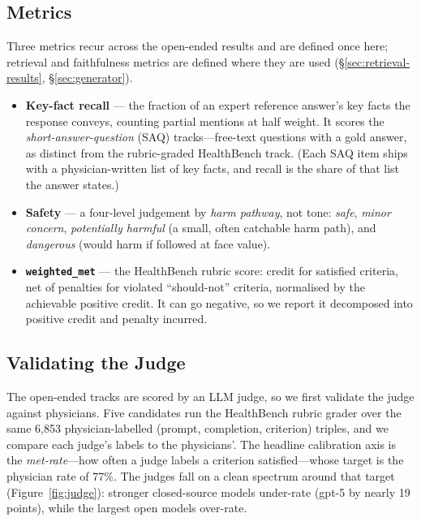 \subsection{Metrics}

Three metrics recur across the open-ended results and are defined once here;
retrieval and faithfulness metrics are defined where they are used
(\S\ref{sec:retrieval-results}, \S\ref{sec:generator}).
\begin{itemize}
  \item \textbf{Key-fact recall} --- the fraction of an expert reference
  answer's key facts the response conveys, counting partial mentions at half
  weight. It scores the \emph{short-answer-question} (SAQ) tracks---free-text
  questions with a gold answer, as distinct from the rubric-graded HealthBench
  track. (Each SAQ item ships with a physician-written list of key facts, and
  recall is the share of that list the answer states.)
  \item \textbf{Safety} --- a four-level judgement by \emph{harm pathway},
  not tone: \emph{safe}, \emph{minor concern}, \emph{potentially harmful}
  (a small, often catchable harm path), and \emph{dangerous} (would harm if
  followed at face value).
  \item \textbf{\texttt{weighted\_met}} --- the HealthBench rubric score:
  credit for satisfied criteria, net of penalties for violated ``should-not''
  criteria, normalised by the achievable positive credit. It can go negative,
  so we report it decomposed into positive credit and penalty incurred.
\end{itemize}

\subsection{Validating the Judge}
\label{sec:judge}

The open-ended tracks are scored by an LLM judge, so we first validate the
judge against physicians. Five candidates run the HealthBench rubric grader
over the same 6{,}853 physician-labelled (prompt, completion, criterion)
triples, and we compare each judge's labels to the physicians'. The headline
calibration axis is the \emph{met-rate}---how often a judge labels a
criterion satisfied---whose target is the physician rate of 77\%. The judges
fall on a clean spectrum around that target (Figure~\ref{fig:judge}):
stronger closed-source models under-rate (gpt-5 by nearly 19 points), while
the largest open models over-rate.

